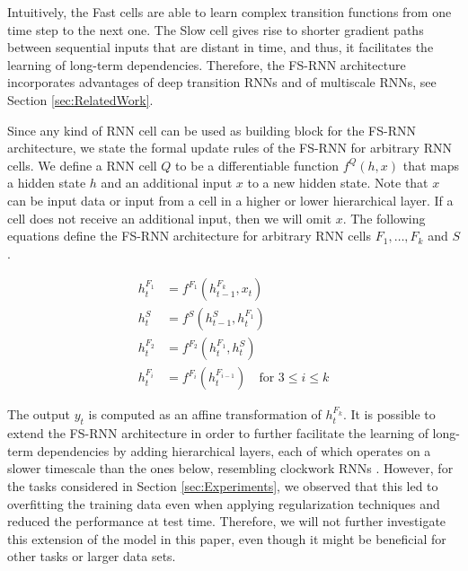 \documentclass{article}
\begin{document}
Intuitively, the Fast cells are able to learn complex transition functions from one time step to the next one. The Slow cell gives rise to shorter gradient paths between sequential inputs that are distant in time, and thus, it facilitates the learning of long-term dependencies. Therefore, the FS-RNN architecture incorporates advantages of deep transition RNNs and of multiscale RNNs, see Section \ref{sec:RelatedWork}.   


Since any kind of RNN cell can be used as building block for the FS-RNN architecture, we state the formal update rules of the FS-RNN for arbitrary RNN cells. We define a RNN cell $Q$  to be a differentiable function $f^Q(h, x)$ that maps a hidden state $h$ and an additional input $x$  to a new hidden state. Note that $x$ can be input data or  input from a cell in a higher or lower hierarchical layer.  If a cell does not receive an additional input, then  we will omit $x$. The following equations define the FS-RNN architecture for arbitrary RNN cells $F_1, \ldots, F_k$ and $S$. 

\begin{align*}
h_{t}^{F_1} &= f^{F_1}(h_{t-1}^{F_k}, x_t) \\
h_{t}^{S}  &= f^{S }(h_{t-1}^{S}, h_{t}^{F_1})\\
h_{t}^{F_2} &= f^{F_2}(h_{t}^{F_1}, h_{t}^{S})\\
h_{t}^{F_i} &= f^{F_i}(h_{t}^{F_{i-1}}) \quad \text{for } 3\leq i\leq k
\end{align*}

The output $y_t$ is computed as an affine transformation of $h_t^{F_k}$. 
It is possible to extend the FS-RNN architecture in order to further facilitate the learning of long-term dependencies by adding  hierarchical layers, each of which operates on a slower timescale than the ones below, resembling clockwork RNNs \cite{koutnik2014clockwork}. 
However, for the tasks considered in Section \ref{sec:Experiments}, we observed that  this led to overfitting  the training data even when applying regularization techniques and reduced the performance at test time. Therefore, we will not further investigate this extension of the model in this paper, even though it might be beneficial for  other tasks or larger data sets.
\end{document}

